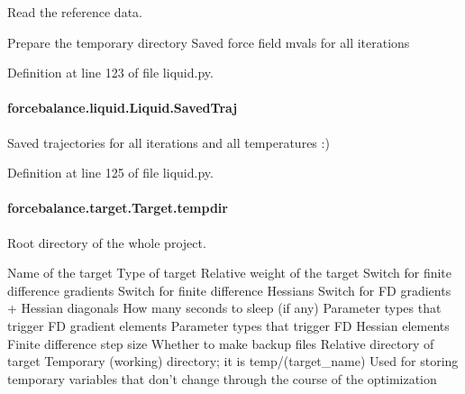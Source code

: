 Read the reference data. 

Prepare the temporary directory Saved force field mvals for all iterations 

Definition at line 123 of file liquid.\-py.

\hypertarget{classforcebalance_1_1liquid_1_1Liquid_a0da0c00cdc193c9c470d7e528043fb99}{
\paragraph[{Saved\-Traj}]{\setlength{\rightskip}{0pt plus 5cm}forcebalance.\-liquid.\-Liquid.\-Saved\-Traj}}\label{classforcebalance_1_1liquid_1_1Liquid_a0da0c00cdc193c9c470d7e528043fb99}


Saved trajectories for all iterations and all temperatures \-:) 



Definition at line 125 of file liquid.\-py.

\hypertarget{classforcebalance_1_1target_1_1Target_aa1f01b5b78db253b5b66384ed11ed193}{
\paragraph[{tempdir}]{\setlength{\rightskip}{0pt plus 5cm}forcebalance.\-target.\-Target.\-tempdir\hspace{0.3cm}{\ttfamily [inherited]}}}\label{classforcebalance_1_1target_1_1Target_aa1f01b5b78db253b5b66384ed11ed193}


Root directory of the whole project. 

Name of the target Type of target Relative weight of the target Switch for finite difference gradients Switch for finite difference Hessians Switch for F\-D gradients + Hessian diagonals How many seconds to sleep (if any) Parameter types that trigger F\-D gradient elements Parameter types that trigger F\-D Hessian elements Finite difference step size Whether to make backup files Relative directory of target Temporary (working) directory; it is temp/(target\-\_\-name) Used for storing temporary variables that don't change through the course of the optimization 

